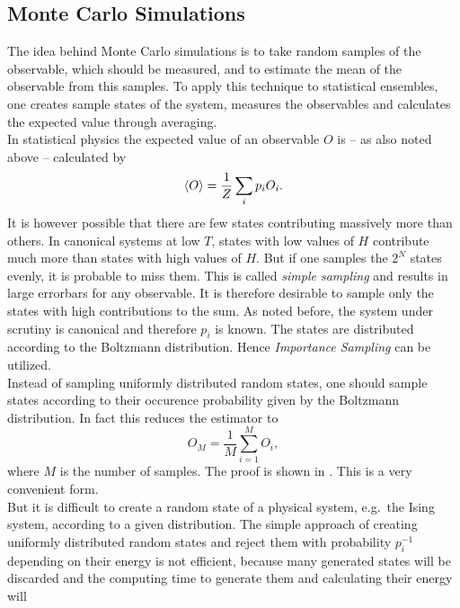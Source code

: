 \subsection{Monte Carlo Simulations}
\label{ssec:montecarlo}
    The idea behind Monte Carlo simulations is to take random samples of
    the observable, which should be measured, and to estimate the mean of
    the observable from this samples. To apply this technique to statistical
    ensembles, one creates sample states of the system, measures the
    observables and calculates the expected value through averaging.\\
    In statistical physics the expected value of an observable \(O\)
    is -- as also noted above -- calculated by
    \begin{equation}
        \left< O \right> = \frac{1}{Z} \sum_i p_i O_i.
    \end{equation}
    It is however possible that there are few states contributing
    massively more than others. In canonical systems at low \(T\),
    states with low values of \(H\) contribute much more than states with
    high values of \(H\).
    But if one samples the \(2^N\) states evenly, it is probable to miss
    them. This is called \emph{simple sampling} and results in large
    errorbars for any observable.
    It is therefore desirable to sample only the states with high
    contributions to the sum.
    As noted before, the system under scrutiny is canonical and therefore
    \(p_i\) is known. The states are distributed according to the Boltzmann
    distribution. Hence \emph{Importance Sampling} can be utilized.\\
    Instead of sampling uniformly distributed random states, one should sample
    states according to their occurence probability given by the Boltzmann
    distribution. In fact this reduces the estimator to
    \begin{equation}
        O_M = \frac{1}{M} \sum_{i=1}^M O_i,
    \end{equation}
    where \(M\) is the number of samples. The proof is shown in \cite{NewmanBarkema1999}.
    This is a very convenient form.\\
    But it is difficult to create a random state of a physical system,
    e.g.\ the Ising system, according to a given distribution. The simple
    approach of creating uniformly distributed random states and reject
    them with probability \(p_i^{-1}\) depending on their energy is not
    efficient, because many generated states will be discarded and the
    computing time to generate them and calculating their energy will
